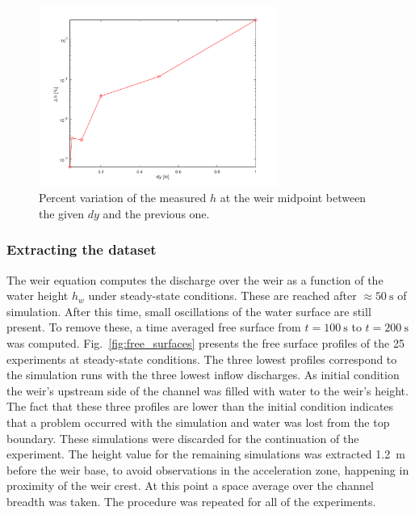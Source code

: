 \begin{figure}[h]
  \centering
  \includegraphics[width=0.7\textwidth]{Figures/diff_center.png}
  \caption{Percent variation of the measured $h$ at the weir midpoint between the given $dy$ and the previous one.}
  \label{fig:diff_center}
\end{figure}


\subsubsection{Extracting the dataset}
The weir equation computes the discharge over the weir as a function of the water height $h_w$ under steady-state conditions.
These are reached after $\approx \SI{50}{\s}$ of simulation.
After this time, small oscillations of the water surface are still present.
To remove these, a time averaged free surface from $t = \SI{100}{\s}$ to $t = \SI{200}{\s}$ was computed.
Fig.~\ref{fig:free_surfaces} presents the free surface profiles of the \num{25} experiments at steady-state conditions.
The three lowest profiles correspond to the simulation runs with the three lowest inflow discharges. 
As initial condition the weir's upstream side of the channel was filled with water to the weir's height.
The fact that these three profiles are lower than the initial condition indicates that a problem occurred with the simulation and water was lost from the top boundary.
These simulations were discarded for the continuation of the experiment.
The height value for the remaining simulations was extracted \SI{1.2}{\m} before the weir base, to avoid observations in the acceleration zone, happening in proximity of the weir crest.
At this point a space average over the channel breadth was taken.
The procedure was repeated for all of the experiments.

